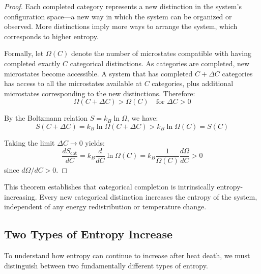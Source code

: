 \documentclass[12pt,a4paper]{article}
\theoremstyle{definition}
\theoremstyle{remark}
\begin{document}
\begin{proof}
Each completed category represents a new distinction in the system's configuration space—a new way in which the system can be organized or observed. More distinctions imply more ways to arrange the system, which corresponds to higher entropy.

Formally, let $\Omega(C)$ denote the number of microstates compatible with having completed exactly $C$ categorical distinctions. As categories are completed, new microstates become accessible. A system that has completed $C + \Delta C$ categories has access to all the microstates available at $C$ categories, plus additional microstates corresponding to the new distinctions. Therefore:
\begin{equation}
\Omega(C + \Delta C) > \Omega(C) \quad \text{for } \Delta C > 0
\end{equation}

By the Boltzmann relation $S = k_B \ln \Omega$, we have:
\begin{equation}
S(C + \Delta C) = k_B \ln \Omega(C + \Delta C) > k_B \ln \Omega(C) = S(C)
\end{equation}

Taking the limit $\Delta C \to 0$ yields:
\begin{equation}
\frac{dS_{\text{cat}}}{dC} = k_B \frac{d}{dC} \ln \Omega(C) = k_B \frac{1}{\Omega(C)} \frac{d\Omega}{dC} > 0
\end{equation}
since $d\Omega/dC > 0$.
\end{proof}

This theorem establishes that categorical completion is intrinsically entropy-increasing. Every new categorical distinction increases the entropy of the system, independent of any energy redistribution or temperature change.

\subsection{Two Types of Entropy Increase}

To understand how entropy can continue to increase after heat death, we must distinguish between two fundamentally different types of entropy.
\end{document}
